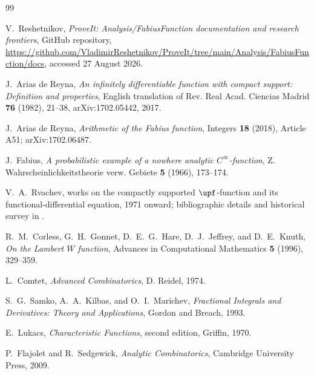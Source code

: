 \documentclass[11pt,oneside]{article}
\theoremstyle{definition}
\theoremstyle{remark}
\newcommand{\1}{\mathbf 1}
\begin{document}
\begin{thebibliography}{99}

V.~Reshetnikov,
\emph{ProveIt: Analysis/FabiusFunction documentation and research frontiers},
GitHub repository,
\url{https://github.com/VladimirReshetnikov/ProveIt/tree/main/Analysis/FabiusFunction/docs},
accessed 27 August 2026.

J.~Arias de Reyna,
\emph{An infinitely differentiable function with compact support: Definition and
properties},
English translation of Rev. Real Acad. Ciencias Madrid \textbf{76} (1982), 21--38,
arXiv:1702.05442, 2017.

J.~Arias de Reyna,
\emph{Arithmetic of the Fabius function},
Integers \textbf{18} (2018), Article A51; arXiv:1702.06487.

J.~Fabius,
\emph{A probabilistic example of a nowhere analytic \(C^\infty\)-function},
Z. Wahrscheinlichkeitstheorie verw. Gebiete \textbf{5} (1966), 173--174.

V.~A.~Rvachev,
works on the compactly supported \(\upf\)-function and its functional-differential
equation, 1971 onward; bibliographic details and historical survey in
\cite{p4:Arias1982,p4:AriasArithmetic}.

R.~M.~Corless, G.~H.~Gonnet, D.~E.~G.~Hare, D.~J.~Jeffrey, and D.~E.~Knuth,
\emph{On the Lambert \(W\) function},
Advances in Computational Mathematics \textbf{5} (1996), 329--359.

L.~Comtet,
\emph{Advanced Combinatorics},
D. Reidel, 1974.

S.~G.~Samko, A.~A.~Kilbas, and O.~I.~Marichev,
\emph{Fractional Integrals and Derivatives: Theory and Applications},
Gordon and Breach, 1993.

E.~Lukacs,
\emph{Characteristic Functions}, second edition,
Griffin, 1970.

P.~Flajolet and R.~Sedgewick,
\emph{Analytic Combinatorics},
Cambridge University Press, 2009.

\end{thebibliography}


\newcommand{\sincPartii}{\operatorname{sinc}}
\newcommand{\falling}[2]{#1^{\underline{#2}}}
\newcommand{\rising}[2]{#1^{\overline{#2}}}
\newcommand{\repoPartii}{\texttt{ProveIt}}
\newcommand{\newresultPartii}{\par\medskip\noindent\textcolor{deepblue}{\textbf{Frontier contribution.}}\ }
\end{document}
